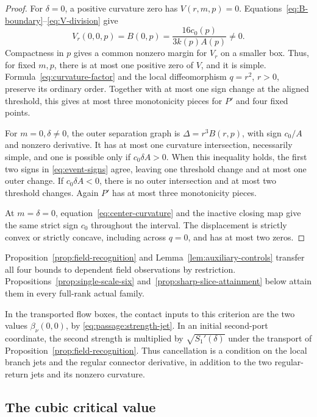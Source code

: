 \begin{proof}
For \(\delta=0\), a positive curvature zero has \(V(r,m,p)=0\).
Equations~\eqref{eq:B-boundary}--\eqref{eq:V-division} give
\[
 V_r(0,0,p)=B(0,p)=\frac{16c_0(p)}{3k(p)A(p)}\ne0.
\]
Compactness in \(p\) gives a common nonzero margin for \(V_r\)
on a smaller box. Thus, for fixed \(m,p\), there is at most one
positive zero of \(V\), and it is simple. Formula~\eqref{eq:curvature-factor}
and the local diffeomorphism \(q=r^2\), \(r>0\), preserve its ordinary
order. Together with at most one sign change at the aligned threshold,
this gives at most three monotonicity pieces for \(P'\) and four fixed points.

For \(m=0,\delta\ne0\), the outer separation graph is
\(\Delta=r^3B(r,p)\), with sign \(c_0/A\) and nonzero derivative.
It has at most one curvature intersection, necessarily simple, and
one is possible only if \(c_0\delta A>0\).
When this inequality holds, the first two signs in
\eqref{eq:event-signs} agree, leaving one threshold change and
at most one outer change. If \(c_0\delta A<0\), there is no outer
intersection and at most two threshold changes. Again \(P'\)
has at most three monotonicity pieces.

At \(m=\delta=0\), equation~\eqref{eq:center-curvature} and the
inactive closing map give the same strict sign \(c_0\) throughout
the interval. The displacement is strictly convex or strictly
concave, including across \(q=0\), and has at most two zeros.
\end{proof}

Proposition~\ref{prop:field-recognition} and
Lemma~\ref{lem:auxiliary-controls} transfer all four bounds to dependent
field observations by restriction. Propositions~\ref{prop:single-scale-six}
and~\ref{prop:sharp-slice-attainment} below attain them in every full-rank
actual family.

In the transported flow boxes, the contact inputs to this criterion are
the two values \(\beta_\nu(0,0)\), by
\eqref{eq:passage:strength-jet}. In an initial second-port coordinate,
the second strength is multiplied by \(\sqrt{S_1'(\delta)}\)
under the transport of Proposition~\ref{prop:field-recognition}.
Thus cancellation is a condition on the local branch jets and the
regular connector derivative, in addition to the two regular-return
jets and its nonzero curvature.


\subsection{The cubic critical value}

